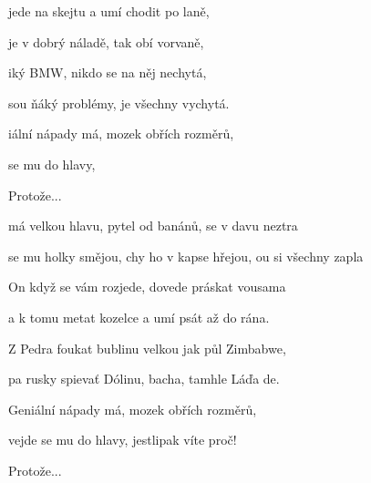 

\zs
{} jede na skejtu
a umí chodit po laně,

 je v dobrý náladě,
tak obí vorvaně,

iký BMW,
nikdo se na něj nechytá,

 sou ňáký problémy,
 je všechny vychytá.

iální nápady má, mozek obřích rozměrů,

 se mu do hlavy, 

Protože...
\ks

\zr
{} má velkou hlavu,  pytel od banánů,
 se v davu neztra

 se mu holky smějou,
chy ho v kapse hřejou,
ou si všechny zapla
\kr

\zs
On když se vám rozjede,
dovede práskat vousama

a k tomu metat kozelce
a umí psát až do rána.

Z Pedra foukat bublinu
velkou jak půl Zimbabwe,

pa rusky spievať Dólinu,
bacha, tamhle Láďa de.

Geniální nápady má, mozek obřích rozměrů,

vejde se mu do hlavy, jestlipak víte proč!

Protože...
\ks

\zr\kr
\zr\kr
\zr\kr

\kp






